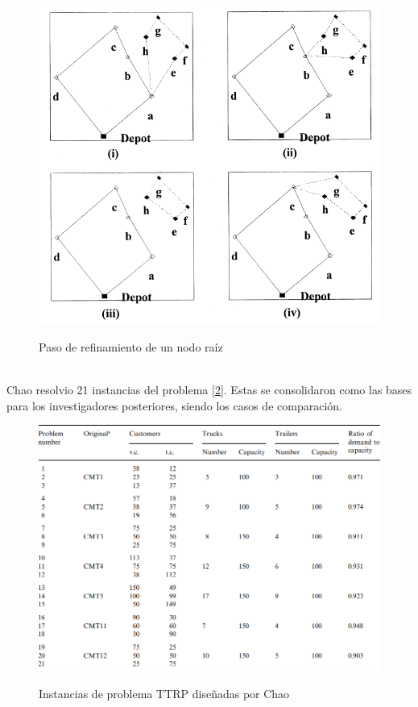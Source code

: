 \documentclass[letter, 10pt]{article}
\begin{document}
    \begin{figure}[h]
    \centering
    \caption{Paso de refinamiento de un nodo raíz}
    \vspace{0.5cm}
    \includegraphics[scale=0.4]{Images/Root.png}
    \label{fig:Root}
    \end{figure}
    \\
   Chao resolvio 21 instancias del problema  [\ref{fig:Instancias}]. Estas se consolidaron como las bases para los investigadores posteriores, siendo los casos de comparación.

\begin{figure}[h]
    \centering
    \caption{Instancias de problema TTRP diseñadas por Chao}
    \vspace{0.5cm}
    \includegraphics[scale=0.6]{Images/Instancias.png}
    \label{fig:Instancias}
\end{figure}
\end{document}
